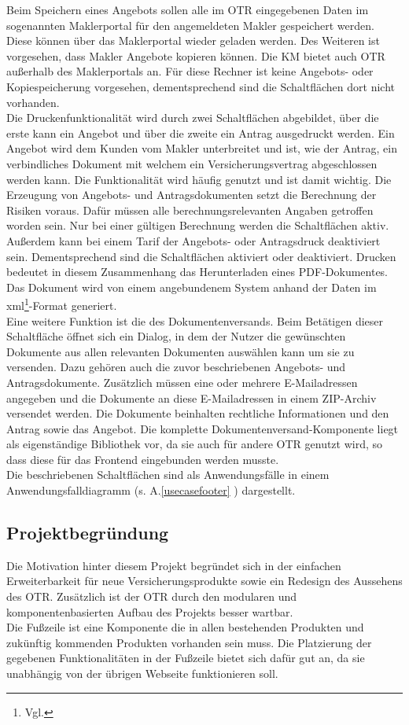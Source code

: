 Beim Speichern eines Angebots sollen alle im \ac{OTR} eingegebenen Daten im sogenannten Maklerportal für den angemeldeten Makler gespeichert werden. Diese können über das Maklerportal wieder geladen werden. Des Weiteren ist vorgesehen, dass Makler Angebote kopieren können.
Die \ac{KM} bietet auch \ac{OTR} außerhalb des Maklerportals an. Für diese Rechner ist keine Angebots- oder Kopiespeicherung vorgesehen, dementsprechend sind die Schaltflächen dort nicht vorhanden. \\
Die Druckenfunktionalität wird durch zwei Schaltflächen abgebildet, über die erste kann ein Angebot und über die zweite ein Antrag ausgedruckt werden. Ein Angebot wird dem Kunden vom Makler unterbreitet und ist, wie der Antrag, ein verbindliches Dokument mit welchem ein Versicherungsvertrag abgeschlossen werden kann. Die Funktionalität wird häufig genutzt und ist damit wichtig. Die Erzeugung von Angebots- und Antragsdokumenten setzt die Berechnung der Risiken voraus. Dafür müssen alle berechnungsrelevanten Angaben getroffen worden sein. Nur bei einer gültigen Berechnung werden die Schaltflächen aktiv. Außerdem kann bei einem Tarif der Angebots- oder Antragsdruck deaktiviert sein. Dementsprechend sind die Schaltflächen aktiviert oder deaktiviert. Drucken bedeutet in diesem Zusammenhang das Herunterladen eines PDF-Dokumentes. Das Dokument wird von einem angebundenem System anhand der Daten im \gls{xml}\footnote{Vgl.\cite{XML2022}}-Format generiert.\\
Eine weitere Funktion ist die des Dokumentenversands. Beim Betätigen dieser Schaltfläche öffnet sich ein Dialog, in dem der Nutzer die gewünschten Dokumente aus allen relevanten Dokumenten auswählen kann um sie zu versenden. Dazu gehören auch die zuvor beschriebenen Angebots- und Antragsdokumente. Zusätzlich müssen eine oder mehrere E-Mailadressen angegeben und die Dokumente an diese E-Mailadressen in einem ZIP-Archiv versendet werden. Die Dokumente beinhalten rechtliche Informationen und den Antrag sowie das Angebot. Die komplette Dokumentenversand-Komponente liegt als eigenständige Bibliothek vor, da sie auch für andere \ac{OTR} genutzt wird, so dass diese für das Frontend eingebunden werden musste.\\
Die beschriebenen Schaltflächen sind als Anwendungsfälle in einem Anwendungsfalldiagramm (s. A.\ref{usecasefooter} ) dargestellt.

\subsection{Projektbegründung}
\label{projektbegründung}
Die Motivation hinter diesem Projekt begründet sich in der einfachen Erweiterbarkeit für neue Versicherungsprodukte sowie ein Redesign des Aussehens des \ac{OTR}. Zusätzlich ist der \ac{OTR} durch den modularen und komponentenbasierten Aufbau des Projekts besser wartbar. \\
Die Fußzeile ist eine Komponente die in allen bestehenden Produkten und zukünftig kommenden Produkten vorhanden sein muss. Die Platzierung der gegebenen Funktionalitäten in der Fußzeile bietet sich dafür gut an, da sie unabhängig von der übrigen Webseite funktionieren soll.
